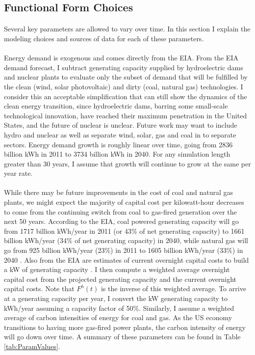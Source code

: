 \documentclass{article}
\begin{document}
\subsection{Functional Form Choices}

\paragraph{} Several key parameters are allowed to vary over time. In this section I explain the modeling choices and sources of data for each of these parameters. 

\paragraph{} Energy demand is exogenous and comes directly from the EIA. From the EIA demand forecast, I subtract generating capacity supplied by hydroelectric dams and nuclear plants to evaluate only the subset of demand that will be fulfilled by the clean (wind, solar photovoltaic) and dirty (coal, natural gas) technologies. I consider this an acceptable simplification that can still show the dynamics of the clean energy transition, since hydroelectric dams, barring some small-scale technological innovation, have reached their maximum penetration in the United States, and the future of nuclear is unclear. Future work may want to include hydro and nuclear as well as separate wind, solar, gas and coal in to separate sectors. Energy demand growth is roughly linear over time, going from 2836 billion kWh in 2011 to 3734 billion kWh in 2040. For any simulation length greater than 30 years, I assume that growth will continue to grow at the same per year rate. 

\paragraph{} While there may be future improvements in the cost of coal and natural gas plants, we might expect the majority of capital cost per kilowatt-hour decreases to come from the continuing switch from coal to gas-fired generation over the next 50 years. According to the EIA, coal powered generating capacity will go from 1717 billion kWh/year in 2011 (or 43\% of net generating capacity) to 1661 billion kWh/year (34\% of net generating capacity) in 2040, while natural gas will go from 925 billion kWh/year (23\%) in 2011 to 1605 billion kWh/year (33\%) in 2040 \cite{EIATable5}. Also from the EIA are estimates of current overnight capital costs to build a kW of generating capacity \cite{EIACapCost}. I then compute a weighted average overnight capital cost from the projected generating capacity and the current overnight capital costs. Note that $F^h(t)$ is the inverse of this weighted average. To arrive at a generating capacity per year, I convert the kW generating capacity to kWh/year assuming a capacity factor of 50\%. Similarly, I assume a weighted average of carbon intensities of energy for coal and gas. As the US economy transitions to having more gas-fired power plants, the carbon intensity of energy will go down over time. A summary of these parameters can be found in Table \ref{tab:ParamValues}. 
\end{document}
